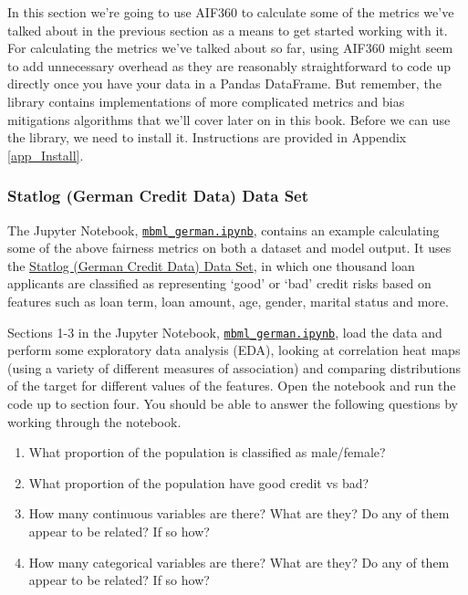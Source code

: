 In this section we're going to use AIF360 to calculate some of the metrics we've talked about in the previous section as a means to get started working with it. For calculating the metrics we've talked about so far, using AIF360 might seem to add unnecessary overhead as they are reasonably straightforward to code up directly once you have your data in a Pandas DataFrame. But remember, the library contains implementations of more complicated metrics and bias mitigations algorithms that we'll cover later on in this book. Before we can use the library, we need to install it. Instructions are provided in Appendix \ref{app_Install}.

\subsubsection*{Statlog (German Credit Data) Data Set}

The Jupyter Notebook, \texttt{\href{https://github.com/leenamurgai/mitigatingbiasml/blob/master/code/source/mbml-german.ipynb}{mbml\_german.ipynb}}, contains an example calculating some of the above fairness metrics on both a dataset and model output. It uses the \href{https://archive.ics.uci.edu/ml/datasets/statlog+(german+credit+data)}{Statlog (German Credit Data) Data Set}, in which one thousand loan applicants are classified as representing `good' or `bad' credit risks based on features such as loan term, loan amount, age, gender, marital status and more.

\begin{lookbox}
Sections 1-3 in the Jupyter Notebook, \texttt{\href{https://github.com/leenamurgai/mitigatingbiasml/blob/master/code/source/mbml-german.ipynb}{mbml\_german.ipynb}}, load the data and perform some exploratory data analysis (EDA), looking at correlation heat maps (using a variety of different measures of association) and comparing distributions of the target for different values of the features. Open the notebook and run the code up to section four. You should be able to answer the following questions by working through the notebook.
\begin{enumerate}
\item What proportion of the population is classified as male/female?
\item What proportion of the population have good credit vs bad?
\item How many continuous variables are there? What are they? Do any of them appear to be related? If so how? 
\item How many categorical variables are there? What are they? Do any of them appear to be related? If so how?
\end{enumerate}
\end{lookbox}

